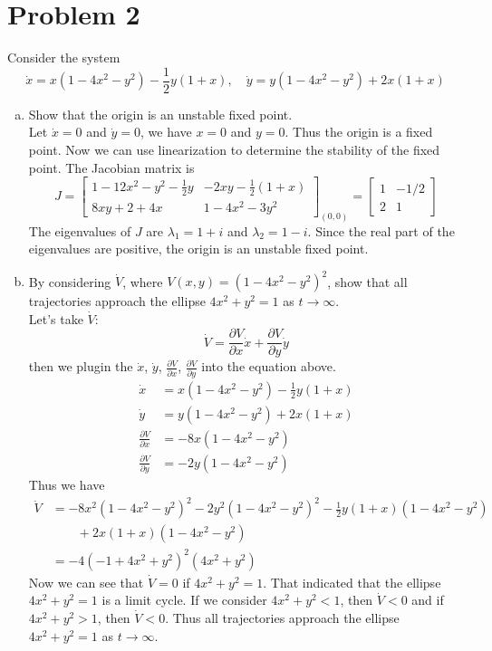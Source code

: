 \documentclass[12pt]{exam}
\begin{document}
\section*{Problem 2}
Consider the system 
\[ \dot{x} = x(1-4x^2 - y^2)- \frac{1}{2}y(1+x), \quad \dot{y} = y(1-4x^2 - y^2)+ 2x(1+x) \]
\begin{enumerate}[(a)]
	\item Show that the origin is an unstable fixed point.\\
	Let $\dot{x} = 0$ and $\dot{y} = 0$, we have $x = 0$ and $y = 0$. Thus the origin is a fixed point. Now we can use linearization to determine the stability of the fixed point. The Jacobian matrix is
	\[ J = \begin{bmatrix}
	1-12x^2-y^2-\frac{1}{2}y & -2xy-\frac{1}{2}(1+x)\\
		8xy + 2+4x & 1-4x^2-3y^2
	\end{bmatrix}_{(0,0)}  = \begin{bmatrix}
		1 & -1/2\\
		2 & 1
	\end{bmatrix} \]
	The eigenvalues of $J$ are $\lambda_1 = 1 + i$ and $\lambda_2 = 1 - i$. Since the real part of the eigenvalues are positive, the origin is an unstable fixed point.
	\item By considering $\dot{V}$, where $V(x,y) = (1-4x^2-y^2)^2$, show that all trajectories approach the ellipse $4x^2 + y^2 = 1$ as $t \to \infty$.\\
	Let's take $\dot{V}$:
	\[ \dot{V} = \frac{\partial V}{\partial x}\dot{x} + \frac{\partial V}{\partial y}\dot{y} \]
	then we plugin the $\dot{x}$, $\dot{y}$, $\frac{\partial V}{\partial x}$, $\frac{\partial V}{\partial y}$ into the equation above. 
	\begin{align}
		\dot{x} &= x(1-4x^2 - y^2)- \frac{1}{2}y(1+x)\\
		\dot{y} &= y(1-4x^2 - y^2)+ 2x(1+x)\\
		\frac{\partial V}{\partial x} &= -8x(1-4x^2-y^2)\\
		\frac{\partial V}{\partial y} &= -2y(1-4x^2-y^2)
	\end{align}
	Thus we have
	\begin{align*}
		\dot{V} &= -8x^2(1-4x^2-y^2)^2 - 2y^2(1-4x^2-y^2)^2 - \frac{1}{2}y(1+x)(1-4x^2-y^2) \\
			& \qquad + 2x(1+x)(1-4x^2-y^2) \\
			& = -4(-1+4x^2+y^2)^2(4x^2+y^2)
	\end{align*}
	Now we can see that $\dot{V} = 0$ if $4x^2 + y^2 = 1$. That indicated that the ellipse $4x^2 + y^2 = 1$ is a limit cycle. If we consider $4x^2 + y^2 < 1$, then $\dot{V} < 0$ and if $4x^2 + y^2 > 1$, then $\dot{V} < 0$. Thus all trajectories approach the ellipse $4x^2 + y^2 = 1$ as $t \to \infty$.
\end{enumerate}
\end{document}
